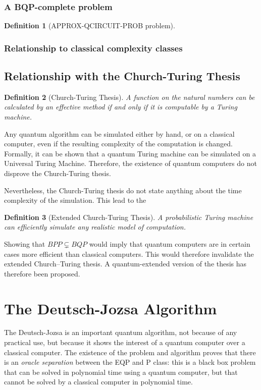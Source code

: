 \documentclass[12pt,a4paper]{article}
\newtheorem{definition}{Definition}
\begin{document}
\subsubsection{A BQP-complete problem}
\begin{definition}[APPROX-QCIRCUIT-PROB problem]
    
\end{definition}

\subsubsection{Relationship to classical complexity classes}


\subsection{Relationship with the Church-Turing Thesis}
\begin{definition}[Church-Turing Thesis]
    A function on the natural numbers can be calculated by an effective method if and only if it is computable by a Turing machine.
\end{definition}

Any quantum algorithm can be simulated either by hand, or on a classical computer, even if the resulting complexity of the computation is changed. Formally, it can be shown that a quantum Turing machine can be simulated on a Universal Turing Machine. Therefore, the existence of quantum computers do not disprove the Church-Turing thesis.

Nevertheless, the Church-Turing thesis do not state anything about the time complexity of the simulation. This lead to the 

\begin{definition}[Extended Church-Turing Thesis]
    A probabilistic Turing machine can efficiently simulate any realistic model of computation.
\end{definition}
Showing that $BPP \varsubsetneq BQP$ would imply that quantum computers are in certain cases more efficient than classical computers. This would therefore invalidate the extended Church–Turing thesis. A quantum-extended version of the thesis has therefore been proposed. \cite{quantum-applied}

\section{The Deutsch-Jozsa Algorithm}
The Deutsch-Jozsa is an important quantum algorithm, not because of any practical use, but because it shows the interest of a quantum computer over a classical computer. The existence of the problem and algorithm proves that there is an \emph{oracle separation} between the EQP and P class: this is a black box problem that can be solved in polynomial time using a quantum computer, but that cannot be solved by a classical computer in polynomial time.
\end{document}
